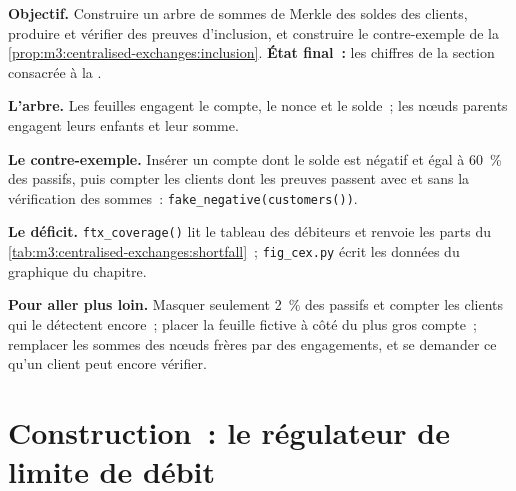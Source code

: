 \begin{tutorial}
\textbf{Objectif.} Construire un arbre de sommes de Merkle des soldes des clients, produire et vérifier des preuves d'inclusion, et
construire le contre-exemple de la \cref{prop:m3:centralised-exchanges:inclusion}. \textbf{État final~:} les
chiffres de la section consacrée à la .
\begin{tutsteps}
\item \textbf{L'arbre.} Les feuilles engagent le compte, le nonce et le solde~; les nœuds parents engagent leurs enfants et leur somme.
\label{lst:m3:centralised-exchanges:tree}
\item \textbf{Le contre-exemple.} Insérer un compte dont le solde est négatif et égal à 60~\% des
passifs, puis compter les clients dont les preuves passent avec et sans la vérification des sommes~:
\texttt{fake\_negative(customers())}.
\item \textbf{Le déficit.} \texttt{ftx\_coverage()} lit le tableau des débiteurs et renvoie les parts du
\cref{tab:m3:centralised-exchanges:shortfall}~; \texttt{fig\_cex.py} écrit les données du graphique du chapitre.
\end{tutsteps}
\textbf{Pour aller plus loin.} Masquer seulement 2~\% des passifs et compter les clients qui le détectent encore~;
placer la feuille fictive à côté du plus gros compte~; remplacer les sommes des nœuds frères par des engagements, et se demander
ce qu'un client peut encore vérifier.
\end{tutorial}

\section{Construction~: le régulateur de limite de débit}\label{bld:m3:centralised-exchanges:ratelimit}

